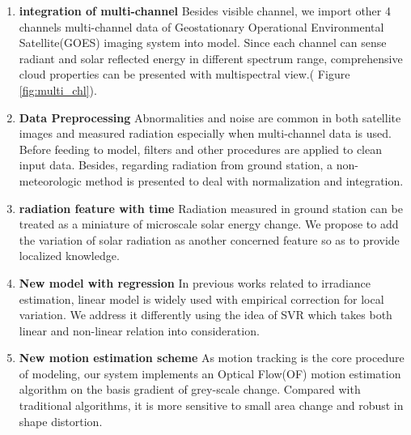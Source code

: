 \documentclass[conference]{IEEEtran}
\begin{document}
\begin{enumerate}%
\item \textbf{integration of multi-channel}  Besides
visible channel, we import other 4 channels multi-channel data of Geostationary
Operational Environmental Satellite(GOES) imaging system into model. Since each
channel can sense radiant and solar reflected energy in different spectrum
range, comprehensive cloud properties can be presented with multispectral
view.( Figure \ref{fig:multi_chl}).

\item \textbf{Data Preprocessing} Abnormalities and noise are common in both
satellite images and measured radiation especially when multi-channel data is
used. Before feeding to model, filters and other procedures are applied to clean
input data. Besides, regarding radiation from ground station, a non-meteorologic
method is presented to deal with normalization and integration.



\item \textbf{radiation feature with time} Radiation measured in ground station
can be treated as a miniature of microscale solar energy change. We propose
to add the variation of solar radiation as another concerned feature so as to provide
localized knowledge.

\item \textbf{New model with regression} In previous works related to irradiance
estimation, linear model is widely used with empirical correction for
local variation\cite{perez2002new}. We address it differently using the idea of
SVR which takes both linear and non-linear relation into consideration.

\item \textbf{New motion estimation scheme} As motion tracking is the core
procedure of modeling, our system implements an Optical Flow(OF) motion
estimation algorithm on the basis gradient of grey-scale change. Compared with
traditional algorithms, it is more sensitive to small area change and robust in
shape distortion.
\end{enumerate}

\end{document}
